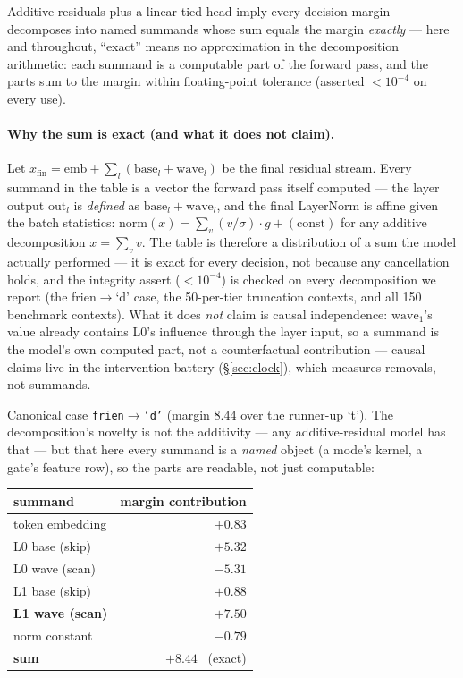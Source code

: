 \documentclass[11pt]{article}
\begin{document}
Additive residuals plus a linear tied head imply every decision margin
decomposes into named summands whose sum equals the margin \emph{exactly}
--- here and throughout, ``exact'' means no approximation in the
decomposition arithmetic: each summand is a computable part of the forward
pass, and the parts sum to the margin within floating-point tolerance
(asserted $< 10^{-4}$ on every use). \paragraph{Why the sum is exact (and what it does not claim).}
Let $x_{\text{fin}} = \mathrm{emb} + \sum_l (\mathrm{base}_l +
\mathrm{wave}_l)$ be the final residual stream. Every summand in the table
is a vector the forward pass itself computed --- the layer output
$\mathrm{out}_l$ is \emph{defined} as $\mathrm{base}_l + \mathrm{wave}_l$,
and the final LayerNorm is affine given the batch statistics:
$\mathrm{norm}(x) = \sum_v (v/\sigma)\cdot g + (\text{const})$ for any
additive decomposition $x = \sum_v v$. The table is therefore a
distribution of a sum the model actually performed --- it is exact for
every decision, not because any cancellation holds, and the integrity
assert ($<10^{-4}$) is checked on every decomposition we report (the
frien$\to$`d' case, the 50-per-tier truncation contexts, and all 150
benchmark contexts). What it does \emph{not} claim is causal
independence: $\mathrm{wave}_1$'s value already contains L0's influence
through the layer input, so a summand is the model's own computed part,
not a counterfactual contribution --- causal claims live in the
intervention battery (\S\ref{sec:clock}), which measures removals, not
summands.

Canonical case
\texttt{frien$\to$`d'} (margin $8.44$ over the runner-up `t'). The
decomposition's novelty is not the additivity --- any additive-residual
model has that --- but that here every summand is a \emph{named} object
(a mode's kernel, a gate's feature row), so the parts are readable, not
just computable:

\begin{center}
\begin{tabular}{lr}
\toprule
summand & margin contribution \\
\midrule
token embedding & $+0.83$ \\
L0 base (skip) & $+5.32$ \\
L0 wave (scan) & $-5.31$ \\
L1 base (skip) & $+0.88$ \\
\textbf{L1 wave (scan)} & $\mathbf{+7.50}$ \\
norm constant & $-0.79$ \\
\midrule
\textbf{sum} & $\mathbf{+8.44}$ \ (exact) \\
\bottomrule
\end{tabular}
\end{center}
\end{document}
